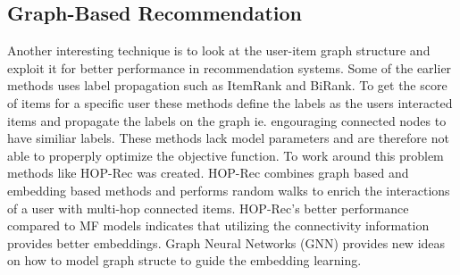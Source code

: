 \subsection{Graph-Based Recommendation}
Another interesting technique is to look at the user-item graph structure and exploit it for better performance in recommendation systems.
Some of the earlier methods uses label propagation such as ItemRank\cite{ItemRank} and BiRank\cite{BiRank}.
To get the score of items for a specific user these methods define the labels as the users interacted items and propagate the labels on the graph ie. engouraging connected nodes to have similiar labels.
These methods lack model parameters and are therefore not able to properply optimize the objective function\cite{NGCF_2019}.
To work around this problem methods like HOP-Rec \cite{HOP_Rec} was created.
HOP-Rec combines graph based and embedding based methods and performs random walks to enrich the interactions of a user with multi-hop connected items.
HOP-Rec's better performance compared to MF models indicates that utilizing the connectivity information provides better embeddings.
Graph Neural Networks (GNN) provides new ideas on how to model graph structe to guide the embedding learning\cite{IND_REP_LEA}.



